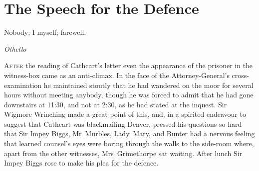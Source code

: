 

\chapter{The Speech for the Defence}

\epigraph{Nobody; I myself; farewell.}{\textit{Othello}}


\lettrine[lines=4]{A}{fter} the reading of Cathcart's letter even the appearance of the prisoner in the witness-box came as an anti-climax. In the face of the Attorney-General's cross-examination he maintained stoutly that he had wandered on the moor for several hours without meeting anybody, though he was forced to admit that he had gone downstairs at 11:30, and not at 2:30, as he had stated at the inquest. Sir Wigmore Wrinching made a great point of this, and, in a spirited endeavour to suggest that Cathcart was blackmailing Denver, pressed his questions so hard that Sir Impey Biggs, Mr~Murbles, Lady~Mary, and Bunter had a nervous feeling that learned counsel's eyes were boring through the walls to the side-room where, apart from the other witnesses, Mrs~Grimethorpe sat waiting. After lunch Sir Impey Biggs rose to make his plea for the defence.

